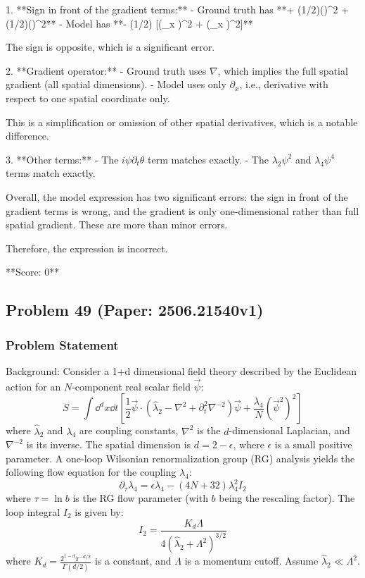 \documentclass[10pt]{article}
\begin{document}
1. **Sign in front of the gradient terms:**  
   - Ground truth has **+ (1/2)(\nabla \theta)^2 + (1/2)(\nabla \psi)^2**  
   - Model has **- (1/2) [(\partial_x \theta)^2 + (\partial_x \psi)^2]**

   The sign is opposite, which is a significant error.

2. **Gradient operator:**  
   - Ground truth uses \(\nabla\), which implies the full spatial gradient (all spatial dimensions).  
   - Model uses only \(\partial_x\), i.e., derivative with respect to one spatial coordinate only.

   This is a simplification or omission of other spatial derivatives, which is a notable difference.

3. **Other terms:**  
   - The \(i \psi \partial_t \theta\) term matches exactly.  
   - The \(\lambda_2 \psi^2\) and \(\lambda_4 \psi^4\) terms match exactly.

Overall, the model expression has two significant errors: the sign in front of the gradient terms is wrong, and the gradient is only one-dimensional rather than full spatial gradient. These are more than minor errors.

Therefore, the expression is incorrect.

**Score: 0**

\newpage
\subsection*{Problem 49 (Paper: 2506.21540v1)}
\subsubsection*{Problem Statement}
Background:
Consider a 1+d dimensional field theory described by the Euclidean action for an $N$-component real scalar field $\vec{\psi}$:
$$S = \int \dd^d x \dd t \left[ \frac{1}{2} \vec{\psi} \cdot \left( \hat \lambda_2 - \nabla^2 + \partial_t^2 \nabla^{-2} \right) \vec{\psi} + \frac{\lambda_4}{N} (\vec{\psi}^2)^2 \right]$$
where $\hat \lambda_2$ and $\lambda_4$ are coupling constants, $\nabla^2$ is the $d$-dimensional Laplacian, and $\nabla^{-2}$ is its inverse. The spatial dimension is $d = 2-\epsilon$, where $\epsilon$ is a small positive parameter. A one-loop Wilsonian renormalization group (RG) analysis yields the following flow equation for the coupling $\lambda_4$:
$$\partial_\tau \lambda_4 = \epsilon \lambda_4 - (4N+32) \lambda_4^2 I_2$$
where $\tau = \ln b$ is the RG flow parameter (with $b$ being the rescaling factor). The loop integral $I_2$ is given by:
$$I_2 = \frac{K_d \Lambda}{4  (\hat \lambda_2+ \Lambda^2)^{3/2}}$$
where $K_d = \frac{2^{1-d}\pi^{-d/2}}{\Gamma(d/2)}$ is a constant, and $\Lambda$ is a momentum cutoff. Assume $\hat \lambda_2 \ll \Lambda^2$.
\end{document}
